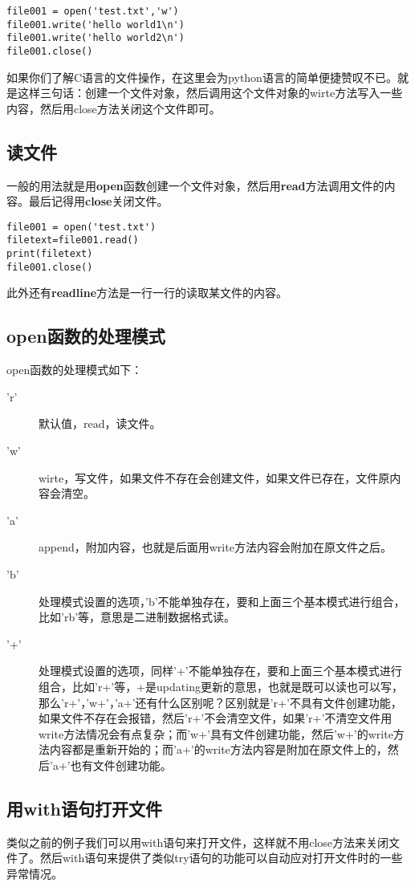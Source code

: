 \documentclass[12pt,oneside]{book}
\begin{document}
\begin{common-format}
\begin{Verbatim}
file001 = open('test.txt','w')
file001.write('hello world1\n')
file001.write('hello world2\n')
file001.close()
\end{Verbatim}

如果你们了解C语言的文件操作，在这里会为python语言的简单便捷赞叹不已。就是这样三句话：创建一个文件对象，然后调用这个文件对象的wirte方法写入一些内容，然后用close方法关闭这个文件即可。


\subsection{读文件}
一般的用法就是用\textbf{open}函数创建一个文件对象，然后用\textbf{read}方法调用文件的内容。最后记得用\textbf{close}关闭文件。
\begin{Verbatim}
file001 = open('test.txt')
filetext=file001.read()
print(filetext)
file001.close()
\end{Verbatim}

此外还有\textbf{readline}方法是一行一行的读取某文件的内容。


\subsection{open函数的处理模式}
open函数的处理模式如下：
\begin{description}
\item['r'] 默认值，read，读文件。
\item['w'] wirte，写文件，如果文件不存在会创建文件，如果文件已存在，文件原内容会清空。
\item['a'] append，附加内容，也就是后面用write方法内容会附加在原文件之后。
\item['b'] 处理模式设置的选项，'b'不能单独存在，要和上面三个基本模式进行组合，比如'rb'等，意思是二进制数据格式读。
\item['+'] 处理模式设置的选项，同样'+'不能单独存在，要和上面三个基本模式进行组合，比如'r+'等，+是updating更新的意思，也就是既可以读也可以写，那么'r+'，'w+'，'a+'还有什么区别呢？区别就是'r+'不具有文件创建功能，如果文件不存在会报错，然后'r+'不会清空文件，如果'r+'不清空文件用write方法情况会有点复杂；而'w+'具有文件创建功能，然后'w+'的write方法内容都是重新开始的；而'a+'的write方法内容是附加在原文件上的，然后'a+'也有文件创建功能。
\end{description}



\subsection{用with语句打开文件}
类似之前的例子我们可以用with语句来打开文件，这样就不用close方法来关闭文件了。然后with语句来提供了类似try语句的功能可以自动应对打开文件时的一些异常情况。


\end{common-format}
\end{document}

